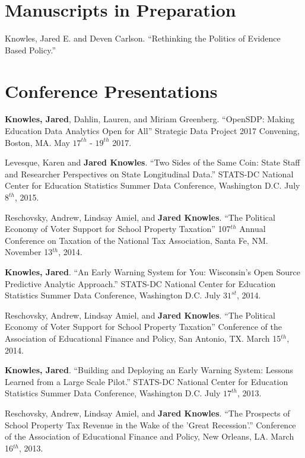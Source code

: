 \documentclass[margin,line]{res}
\begin{document}
\begin{resume}
\section{\sc Manuscripts in Preparation}

Knowles, Jared E. and Deven Carlson. ``Rethinking the Politics of Evidence Based 
Policy.'' 


\vspace*{5mm}

\section{\sc Conference Presentations}

\textbf{Knowles, Jared}, Dahlin, Lauren, and Miriam Greenberg. ``OpenSDP: Making 
Education Data Analytics Open for All'' 
Strategic Data Project 2017 Convening, Boston, MA. May $17^{th}$ - $19^{th}$ 2017.

Levesque, Karen and \textbf{Jared Knowles}. ``Two Sides of the Same Coin: State 
Staff and Researcher Perspectives on State Longitudinal Data.'' STATS-DC National Center for Education Statistics Summer Data Conference, Washington D.C. July $8^{th}$, 2015.

Reschovsky, Andrew, Lindsay Amiel, and \textbf{Jared Knowles}. ``The Political Economy of Voter Support for School Property Taxation'' 107$^{th}$ Annual Conference on Taxation of the National Tax Association, Santa Fe, NM. November 13$^{th}$, 2014. 

\textbf{Knowles, Jared}. ``An Early Warning System for You: Wisconsin’s Open Source Predictive Analytic Approach.'' STATS-DC National Center for Education Statistics Summer Data Conference, Washington D.C. July $31^{st}$, 2014.

Reschovsky, Andrew, Lindsay Amiel, and \textbf{Jared Knowles}. ``The Political Economy of Voter Support for School Property Taxation'' Conference of the Association of Educational Finance and Policy, San Antonio, TX. March 15$^{th}$, 2014. 

\textbf{Knowles, Jared}. ``Building and Deploying an Early Warning System: Lessons Learned from a Large Scale Pilot.'' STATS-DC National Center for Education Statistics Summer Data Conference, Washington D.C. July $17^{th}$, 2013.

Reschovsky, Andrew, Lindsay Amiel, and \textbf{Jared Knowles}. ``The Prospects of School Property Tax Revenue in the Wake of the 'Great Recession'.'' Conference of the Association of Educational Finance and Policy, New Orleans, LA. March 16$^{th}$, 2013. 


\end{resume}
\end{document}
